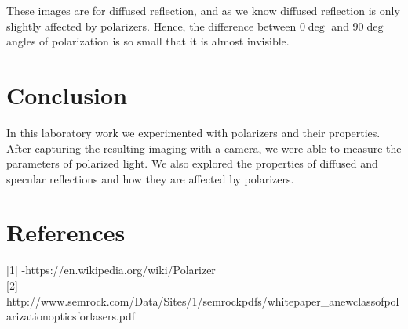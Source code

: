 \documentclass[english]{article}
\begin{document}
These images are for diffused reflection, and as we know diffused reflection is only slightly affected by polarizers.
Hence, the difference between $0\deg$ and $90\deg$ angles of polarization is so small that it is almost invisible.\\
\section{Conclusion}
In this laboratory work we experimented with polarizers and their properties. 
After capturing the resulting imaging with a camera, we were able to measure the parameters of polarized light.
We also explored the properties of diffused and specular reflections and how they are affected by polarizers.

\section{References}

{[}1{]} -https://en.wikipedia.org/wiki/Polarizer\\
{[}2{]} -http://www.semrock.com/Data/Sites/1/semrockpdfs/whitepaper\_anewclassofpolarizationopticsforlasers.pdf
\end{document}

